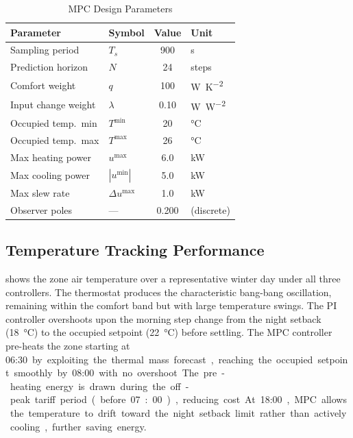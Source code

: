 \documentclass[conference,a4paper]{IEEEtran}[2015/08/26]
\begin{document}
\begin{table}[t]
  \caption{MPC Design Parameters}
  \label{tab:mpc_params}
  \centering
  \begin{tabular}{llS[table-format=3.3]l}
    \toprule
    \textbf{Parameter} & \textbf{Symbol}
      & {\textbf{Value}} & \textbf{Unit} \\
    \midrule
    Sampling period       & $T_s$       & 900    & \si{\second} \\
    Prediction horizon    & $N$         & 24     & steps \\
    Comfort weight        & $q$         & 100    & \si{\watt\per\kelvin\squared} \\
    Input change weight   & $\lambda$   & 0.10   & \si{\watt\per\watt\squared} \\
    Occupied temp.\ min   & $T^{\min}$  & 20     & \si{\celsius} \\
    Occupied temp.\ max   & $T^{\max}$  & 26     & \si{\celsius} \\
    Max heating power     & $u^{\max}$  & 6.0    & \si{\kilo\watt} \\
    Max cooling power     & $|u^{\min}|$& 5.0    & \si{\kilo\watt} \\
    Max slew rate         & $\Delta u^{\max}$ & 1.0 & \si{\kilo\watt} \\
    Observer poles        & ---         & 0.200  & (discrete) \\
    \bottomrule
  \end{tabular}
\end{table}

\subsection{Temperature Tracking Performance}

 shows the zone air temperature over a representative
winter day under all three controllers. The thermostat produces the
characteristic bang-bang oscillation, remaining within the comfort band
but with large temperature swings. The PI controller overshoots upon
the morning step change from the night setback (\SI{18}{\celsius}) to
the occupied setpoint (\SI{22}{\celsius}) before settling. The MPC
controller pre-heats the zone starting at \SI{06:30} by exploiting the
thermal mass forecast, reaching the occupied setpoint smoothly by
\SI{08:00} with no overshoot. The pre-heating energy is drawn during the
off-peak tariff period (before 07:00), reducing cost. At \SI{18:00},
MPC allows the temperature to drift toward the night setback limit
rather than actively cooling, further saving energy.
\end{document}
